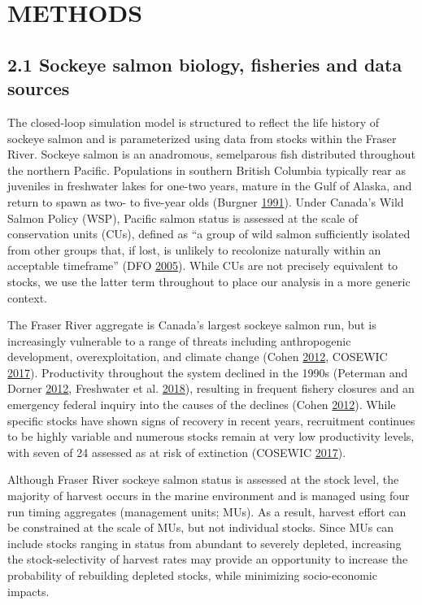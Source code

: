 \documentclass[11pt]{book}
\begin{document}
\section{METHODS}\label{methods}

\subsection{2.1 Sockeye salmon biology, fisheries and data sources}\label{sockeye-salmon-biology-fisheries-and-data-sources}

The closed-loop simulation model is structured to reflect the life history of sockeye salmon and is parameterized using data from stocks within the Fraser River. Sockeye salmon is an anadromous, semelparous fish distributed throughout the northern Pacific. Populations in southern British Columbia typically rear as juveniles in freshwater lakes for one-two years, mature in the Gulf of Alaska, and return to spawn as two- to five-year olds (Burgner \protect\hyperlink{ref-Burgner1991}{1991}). Under Canada's Wild Salmon Policy (WSP), Pacific salmon status is assessed at the scale of conservation units (CUs), defined as ``a group of wild salmon sufficiently isolated from other groups that, if lost, is unlikely to recolonize naturally within an acceptable timeframe'' (DFO \protect\hyperlink{ref-DFO2005}{2005}). While CUs are not precisely equivalent to stocks, we use the latter term throughout to place our analysis in a more generic context.

The Fraser River aggregate is Canada's largest sockeye salmon run, but is increasingly vulnerable to a range of threats including anthropogenic development, overexploitation, and climate change (Cohen \protect\hyperlink{ref-Cohen2012}{2012}, COSEWIC \protect\hyperlink{ref-COSEWIC2017}{2017}). Productivity throughout the system declined in the 1990s (Peterman and Dorner \protect\hyperlink{ref-Peterman2012}{2012}, Freshwater et al. \protect\hyperlink{ref-Freshwater2018}{2018}), resulting in frequent fishery closures and an emergency federal inquiry into the causes of the declines (Cohen \protect\hyperlink{ref-Cohen2012}{2012}). While specific stocks have shown signs of recovery in recent years, recruitment continues to be highly variable and numerous stocks remain at very low productivity levels, with seven of 24 assessed as at risk of extinction (COSEWIC \protect\hyperlink{ref-COSEWIC2017}{2017}).

Although Fraser River sockeye salmon status is assessed at the stock level, the majority of harvest occurs in the marine environment and is managed using four run timing aggregates (management units; MUs). As a result, harvest effort can be constrained at the scale of MUs, but not individual stocks. Since MUs can include stocks ranging in status from abundant to severely depleted, increasing the stock-selectivity of harvest rates may provide an opportunity to increase the probability of rebuilding depleted stocks, while minimizing socio-economic impacts.
\end{document}
